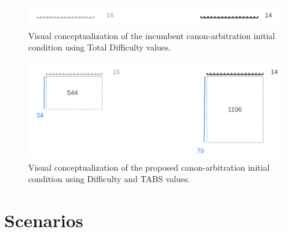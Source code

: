 \documentclass[11pt]{article}
\theoremstyle{plain}
\begin{document}
\begin{figure}[tph]
    \centering
    \includegraphics[width=1.0\textwidth]{imgs/vis_blocksegment_canonpref_incumbent_ex.png}
    \caption{Visual conceptualization of the incumbent canon-arbitration
    initial condition using Total Difficulty values.
    }
    \label{fig:blocksegment_forks_canonpref_incumbent_ex}
\end{figure}


\begin{figure}[tph]
    \centering
    \includegraphics[width=1.0\textwidth]{imgs/vis_blocksegment_canonpref_proposed_ex.png}
    \caption{Visual conceptualization of the proposed canon-arbitration initial
    condition using Difficulty and TABS values.
    }
    \label{fig:blocksegment_forks_canonpref_proposed_ex}
\end{figure}


\section{\normalsize{Scenarios}}\label{sec: scenarios}
\end{document}
